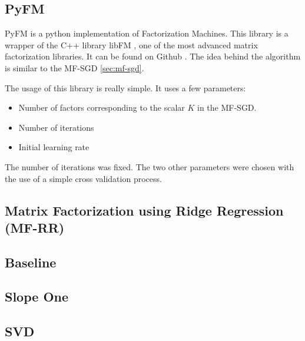 \documentclass[10pt,conference,compsocconf]{IEEEtran}
\begin{document}
\subsection{PyFM}


PyFM is a python implementation of Factorization Machines. This library is a wrapper of the C++ library libFM \cite{rendle:tist2012}, one of the most advanced matrix factorization libraries. It can be found on Github \cite{pyfm}. The idea behind the algorithm is similar to the MF-SGD \ref{sec:mf-sgd}. 

The usage of this library is really simple. It uses a few parameters:
\begin{itemize}
 \item Number of factors corresponding to the scalar $K$ in the MF-SGD.
 \item Number of iterations
 \item Initial learning rate
\end{itemize}

The number of iterations was fixed. The two other parameters were chosen with the use of a simple cross validation process.

\subsection{Matrix Factorization using Ridge Regression (MF-RR)}

\subsection{Baseline}

\subsection{Slope One}

\subsection{SVD}
\end{document}
